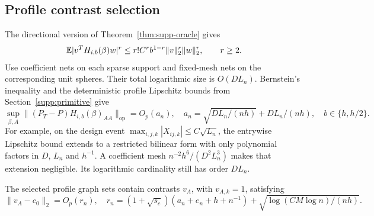 \subsection{Profile contrast selection}

The directional version of Theorem~\ref{thm:supp-oracle} gives
\begin{equation}\label{eq:supp-directional-moments}
 \mathbb{E}|v^TH_{i,b}(\beta)w|^r
       \leq r!C^r b^{1-r}\|v\|_2^r\|w\|_2^r,
       \qquad r\geq2.
\end{equation}
Use coefficient nets on each sparse support and fixed-mesh nets on
the corresponding unit spheres. Their total logarithmic size is
$O(DL_n)$. Bernstein's inequality and the deterministic profile
Lipschitz bounds from Section~\ref{supp:primitive} give
\begin{equation}\label{eq:supp-operator-rate}
 \sup_{\beta,A}\|(P_T-P)H_{i,b}(\beta)_{AA}\|_{\mathrm{op}}
       =O_p(a_n),\quad
 a_n=\sqrt{DL_n/(nh)}+DL_n/(nh),\quad b\in\{h,h/2\}.
\end{equation}
For example, on the design event
$\max_{i,j,k}|X_{ij,k}|\leq C\sqrt{L_n}$, the entrywise Lipschitz
bound extends to a restricted bilinear form with only polynomial
factors in $D$, $L_n$ and $h^{-1}$. A coefficient mesh
$n^{-2}h^6/(D^2L_n^3)$ makes that extension negligible. Its
logarithmic cardinality still has order $DL_n$.

\begin{lemma}\label{lem:supp-nodewise}
The selected profile graph sets contain contrasts $v_A$, with
$v_{A,k}=1$, satisfying
\begin{equation}\label{eq:supp-rn}
 \|v_A-c_0\|_2=O_p(r_n),\quad
 r_n=(1+\sqrt{s_c})(a_n+e_n+h+n^{-1})
                      +\sqrt{\log(CM\log n)/(nh)}.
\end{equation}
\end{lemma}

